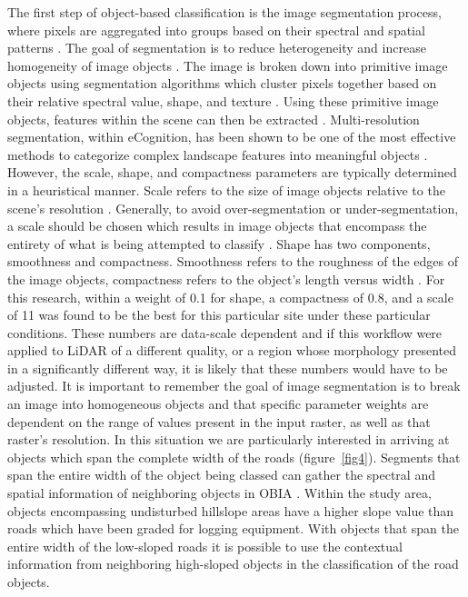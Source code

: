 \documentclass[remotesensing,article,submit,pdftex,moreauthors]{Definitions/mdpi}
\begin{document}
The first step of object-based classification is the image segmentation process, where pixels are aggregated into groups based on their spectral and spatial patterns \cite{alon}. The goal of segmentation is to reduce heterogeneity and increase homogeneity of image objects \cite{naggar}. The image is broken down into primitive image objects using segmentation algorithms which cluster pixels together based on their relative spectral value, shape, and texture \cite{xu}. Using these primitive image objects, features within the scene can then be extracted \cite{naggar, xu}. Multi-resolution segmentation, within eCognition, has been shown to be one of the most effective methods to categorize complex landscape features into meaningful objects \cite{carreira, naggar, tab}. However, the scale, shape, and compactness parameters are typically determined in a heuristical manner. Scale refers to the size of image objects relative to the scene’s resolution \cite{duan, naggar}. Generally, to avoid over-segmentation or under-segmentation, a scale should be chosen which results in image objects that encompass the entirety of what is being attempted to classify \cite{duan, sherba}. Shape has two components, smoothness and compactness. Smoothness refers to the roughness of the edges of the image objects, compactness refers to the object’s length versus width \cite{naggar}. For this research, within a weight of 0.1 for shape, a compactness of 0.8, and a scale of 11 was found to be the best for this particular site under these particular conditions. These numbers are data-scale dependent and if this workflow were applied to LiDAR of a different quality, or a region whose morphology presented in a significantly different way, it is likely that these numbers would have to be adjusted. It is important to remember the goal of image segmentation is to break an image into homogeneous objects and that specific parameter weights are dependent on the range of values present in the input raster, as well as that raster’s resolution. In this situation we are particularly interested in arriving at objects which span the complete width of the roads (figure~\ref{fig4}). Segments that span the entire width of the object being classed can gather the spectral and spatial information of neighboring objects in OBIA \cite{duan, sherba, xu}. Within the study area, objects encompassing undisturbed hillslope areas have a higher slope value than roads which have been graded for logging equipment. With objects that span the entire width of the low-sloped roads it is possible to use the contextual information from neighboring high-sloped objects in the classification of the road objects. 
\end{document}

